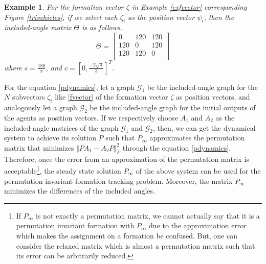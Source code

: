 \documentclass[11pt, a4paper, oneside, openany, reqno]{book}
\newtheorem{example}{Example}
\theoremstyle{definition}
\theoremstyle{remark}
\numberwithin{equation}{chapter} %
\newcommand{\GRP}{\mathcal{G}}
\begin{document}
\begin{example}
	For the formation vector $ \zeta $ in Example \ref{exfvector}
	corresponding Figure \ref{trivehicles}, 
	if we select each $ \zeta_i $ as the position vector $ \psi_i $, 
	then the included-angle matrix $ \Theta $ is as follows.
	\begin{equation}
		\Theta = \left[ \begin{array}{ccc } 
		0 & 120 & 120 \\
		120 & 0 & 120 \\
		120 & 120 & 0 \\		
		\end{array} \right]
	\end{equation}
	where $ s=\frac{180}{\pi} $, and $ c=\left[ 0, \frac{-2\sqrt{3}}{3} \right]^T $.
\end{example}

For the equation \eqref{pdynamics},
let a graph $ \GRP_1 $ be the included-angle graph 
for the $ N $ subvectors $ \zeta_i $ like \eqref{fvector} 
of the formation vector $ \zeta $ as position vectors,
and analogously let a graph $ \GRP_2 $ be the included-angle graph 
for the initial outputs of the agents as position vectors.
If we respectively choose $ A_1 $ and $ A_2 $ 
as the included-angle matrices of the graph $ \GRP_1 $ and $ \GRP_2 $,
then, we can get the dynamical system to achieve its solution $ P $ such that $ P_\infty $
approximates the permutation matrix that minimizes $ \Vert PA_1 - A_2 P \Vert_F^2 $
through the equation \eqref{pdynamics}.
Therefore, once the error from an approximation of the permutation matrix is acceptable\footnote
{If $ P_\infty $ is not exactly a permutation matrix, we cannot actually say that 
it is a permutation invariant formation with $ P_\infty $ 
due to the approximation error which makes the assignment on a formation be confused.
But, one can consider the relaxed matrix which is almost a permutation matrix such that
its error can be arbitrarily reduced.},
the steady state solution $ P_\infty $ of the above system can be used for 
the permutation invariant formation tracking problem. Moreover, the matrix $ P_\infty $ minimizes 
the differences of the included angles.
\end{document}
